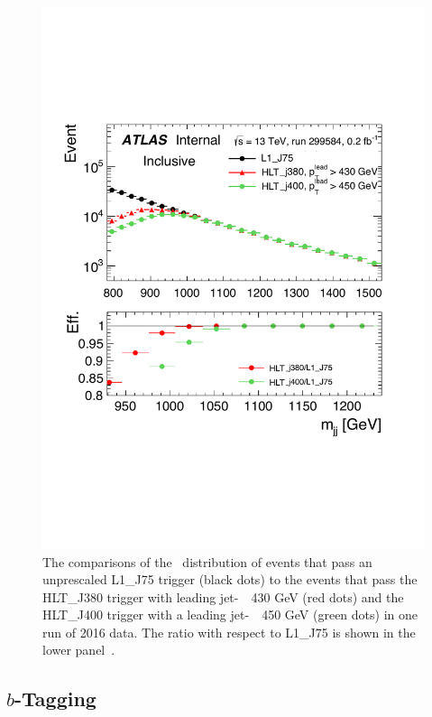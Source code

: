 \begin{figure}[!ht]
  \begin{center}
    \includegraphics[width=0.8\linewidth, angle=0]{figs/Dibjet/ICHEP/evt-mjj.pdf}
  \end{center}
  \caption[The comparisons of the \mjj~distribution of events that pass an unprescaled L1\_J75 trigger (black dots) to the
    events that pass the HLT\_J380 trigger with leading jet-\pT~\gt~430 GeV (red dots) and 
    the HLT\_J400 trigger with a leading jet-\pT~\gt~450 GeV (green dots) in one run of 2016 data.
    The ratio with respect to L1\_J75 is shown in the lower panel.]
        {The comparisons of the \mjj~distribution of events that pass an unprescaled L1\_J75 trigger (black dots) to the
    events that pass the HLT\_J380 trigger with leading jet-\pT~\gt~430 GeV (red dots) and 
    the HLT\_J400 trigger with a leading jet-\pT~\gt~450 GeV (green dots) in one run of 2016 data.
    The ratio with respect to L1\_J75 is shown in the lower panel~\cite{dibjet-ichep_conf}.}
  \label{fig:evt-mjj}
\end{figure}

\subsection{$b$-Tagging}
\label{sec:evt-sel-btag}

